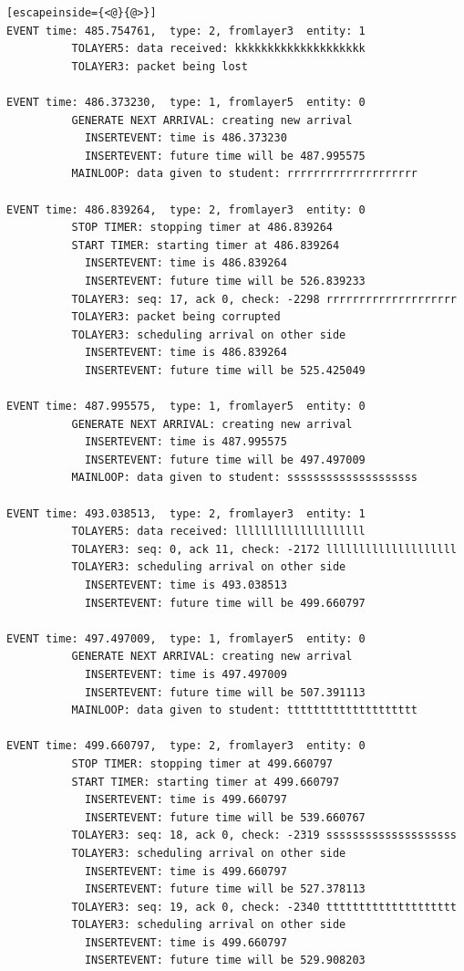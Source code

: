 \documentclass[paper=a4, fontsize=11pt]{scrartcl}
\numberwithin{equation}{section}		%
\numberwithin{figure}{section}			%
\numberwithin{table}{section}				%
\begin{document}
\begin{lstlisting}[escapeinside={<@}{@>}]
EVENT time: 485.754761,  type: 2, fromlayer3  entity: 1
          TOLAYER5: data received: kkkkkkkkkkkkkkkkkkkk
          TOLAYER3: packet being lost

EVENT time: 486.373230,  type: 1, fromlayer5  entity: 0
          GENERATE NEXT ARRIVAL: creating new arrival
            INSERTEVENT: time is 486.373230
            INSERTEVENT: future time will be 487.995575
          MAINLOOP: data given to student: rrrrrrrrrrrrrrrrrrrr

EVENT time: 486.839264,  type: 2, fromlayer3  entity: 0
          STOP TIMER: stopping timer at 486.839264
          START TIMER: starting timer at 486.839264
            INSERTEVENT: time is 486.839264
            INSERTEVENT: future time will be 526.839233
          TOLAYER3: seq: 17, ack 0, check: -2298 rrrrrrrrrrrrrrrrrrrr
          TOLAYER3: packet being corrupted
          TOLAYER3: scheduling arrival on other side
            INSERTEVENT: time is 486.839264
            INSERTEVENT: future time will be 525.425049

EVENT time: 487.995575,  type: 1, fromlayer5  entity: 0
          GENERATE NEXT ARRIVAL: creating new arrival
            INSERTEVENT: time is 487.995575
            INSERTEVENT: future time will be 497.497009
          MAINLOOP: data given to student: ssssssssssssssssssss

EVENT time: 493.038513,  type: 2, fromlayer3  entity: 1
          TOLAYER5: data received: llllllllllllllllllll
          TOLAYER3: seq: 0, ack 11, check: -2172 llllllllllllllllllll
          TOLAYER3: scheduling arrival on other side
            INSERTEVENT: time is 493.038513
            INSERTEVENT: future time will be 499.660797

EVENT time: 497.497009,  type: 1, fromlayer5  entity: 0
          GENERATE NEXT ARRIVAL: creating new arrival
            INSERTEVENT: time is 497.497009
            INSERTEVENT: future time will be 507.391113
          MAINLOOP: data given to student: tttttttttttttttttttt

EVENT time: 499.660797,  type: 2, fromlayer3  entity: 0
          STOP TIMER: stopping timer at 499.660797
          START TIMER: starting timer at 499.660797
            INSERTEVENT: time is 499.660797
            INSERTEVENT: future time will be 539.660767
          TOLAYER3: seq: 18, ack 0, check: -2319 ssssssssssssssssssss
          TOLAYER3: scheduling arrival on other side
            INSERTEVENT: time is 499.660797
            INSERTEVENT: future time will be 527.378113
          TOLAYER3: seq: 19, ack 0, check: -2340 tttttttttttttttttttt
          TOLAYER3: scheduling arrival on other side
            INSERTEVENT: time is 499.660797
            INSERTEVENT: future time will be 529.908203


\end{lstlisting}
\end{document}
